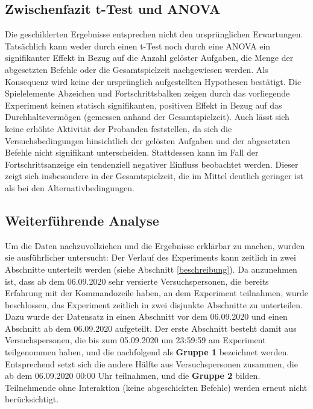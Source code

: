 
\subsection{Zwischenfazit t-Test und ANOVA}
Die geschilderten Ergebnisse entsprechen nicht den ursprünglichen Erwartungen. Tatsächlich kann weder durch einen t-Test noch durch eine ANOVA ein signifikanter Effekt in Bezug auf die Anzahl gelöster Aufgaben, die Menge der abgesetzten Befehle oder die Gesamtspielzeit nachgewiesen werden. Als Konsequenz wird keine der ursprünglich aufgestellten Hypothesen bestätigt. Die Spielelemente Abzeichen und Fortschrittsbalken zeigen durch das vorliegende Experiment keinen statisch signifikanten, positiven Effekt in Bezug auf das Durchhaltevermögen (gemessen anhand der Gesamtspielzeit). Auch lässt sich keine erhöhte Aktivität der Probanden feststellen, da sich die Versuchsbedingungen hinsichtlich der gelösten Aufgaben und der abgesetzten Befehle nicht signifikant unterscheiden. Stattdessen kann im Fall der Fortschrittsanzeige ein tendenziell negativer Einfluss beobachtet werden. Dieser zeigt sich insbesondere in der Gesamtspielzeit, die im Mittel deutlich geringer ist als bei den Alternativbedingungen. 

\subsection{Weiterführende Analyse}
Um die Daten nachzuvollziehen und die Ergebnisse erklärbar zu machen, wurden sie ausführlicher untersucht: Der Verlauf des Experiments kann zeitlich in zwei Abschnitte unterteilt werden (siehe Abschnitt \ref{beschreibung}). Da anzunehmen ist, dass ab dem 06.09.2020 sehr versierte Versuchspersonen, die bereits Erfahrung mit der Kommandozeile haben, an dem Experiment teilnahmen, wurde beschlossen, das Experiment zeitlich in zwei disjunkte Abschnitte zu unterteilen. Dazu wurde der Datensatz in einen Abschnitt vor dem 06.09.2020 und einen Abschnitt ab dem 06.09.2020 aufgeteilt. Der erste Abschnitt besteht damit aus Versuchspersonen, die bis zum 05.09.2020 um 23:59:59 am Experiment teilgenommen haben, und die nachfolgend als \textbf{Gruppe 1} bezeichnet werden. Entsprechend setzt sich die andere Hälfte aus Versuchspersonen zusammen, die ab dem 06.09.2020 00:00 Uhr teilnahmen, und die \textbf{Gruppe 2} bilden. Teilnehmende ohne Interaktion (keine abgeschickten Befehle) werden erneut nicht berücksichtigt.

